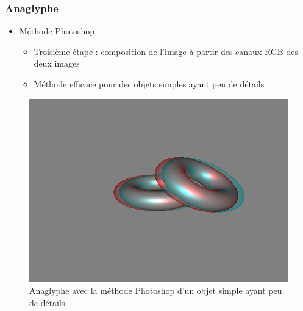 \documentclass{beamer}
\begin{document}
%
\begin{frame}
\frametitle{Anaglyphe}
\begin{itemize}[label=$\bullet$]
\item Méthode Photoshop \cite{stereoAnaglyph}
	\begin{itemize}[label=$\circ$]
	\item Troisième étape : composition de l'image à partir des canaux RGB des deux images
	\item Méthode efficace pour des objets simples ayant peu de détails
	\end{itemize}
\end{itemize}
\begin{figure}
\centering
\includegraphics[scale=0.28]{donuts_photoshop.png}
\caption{Anaglyphe avec la méthode Photoshop d'un objet simple ayant peu de détails }
\end{figure}


\end{frame}
\end{document}
